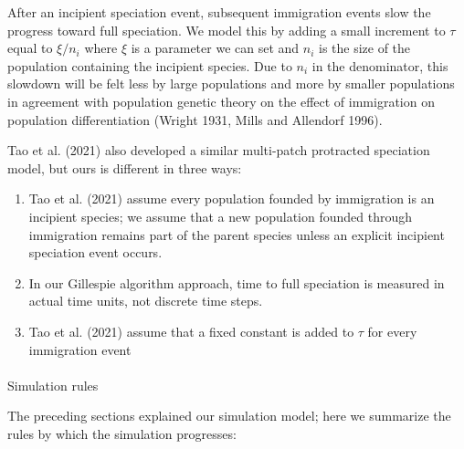 \documentclass[
  letterpaper,
  DIV=11,
  numbers=noendperiod]{scrartcl}
\makeatletter
\let\oldparagraph\paragraph
\renewcommand{\paragraph}{
    \@ifstar
      \xxxParagraphStar
      \xxxParagraphNoStar
  }
\newcommand{\xxxParagraphStar}[1]{\oldparagraph*{#1}\mbox{}}
\newcommand{\xxxParagraphNoStar}[1]{\oldparagraph{#1}\mbox{}}
\providecommand{\tightlist}{%
  \setlength{\itemsep}{0pt}\setlength{\parskip}{0pt}}
\makeatother
\begin{document}
After an incipient speciation event, subsequent immigration events slow
the progress toward full speciation. We model this by adding a small
increment to \(\tau\) equal to \(\xi / n_i\) where \(\xi\) is a
parameter we can set and \(n_i\) is the size of the population
containing the incipient species. Due to \(n_i\) in the denominator,
this slowdown will be felt less by large populations and more by smaller
populations in agreement with population genetic theory on the effect of
immigration on population differentiation (Wright 1931, Mills and
Allendorf 1996).

Tao et al. (2021) also developed a similar multi-patch protracted
speciation model, but ours is different in three ways:

\begin{enumerate}
\def\labelenumi{\arabic{enumi}.}
\tightlist
\item
  Tao et al. (2021) assume every population founded by immigration is an
  incipient species; we assume that a new population founded through
  immigration remains part of the parent species unless an explicit
  incipient speciation event occurs.
\item
  In our Gillespie algorithm approach, time to full speciation is
  measured in actual time units, not discrete time steps.
\item
  Tao et al. (2021) assume that a fixed constant is added to \(\tau\)
  for every immigration event
\end{enumerate}

\paragraph{Simulation rules}\label{simulation-rules}

The preceding sections explained our simulation model; here we summarize
the rules by which the simulation progresses:
\end{document}
